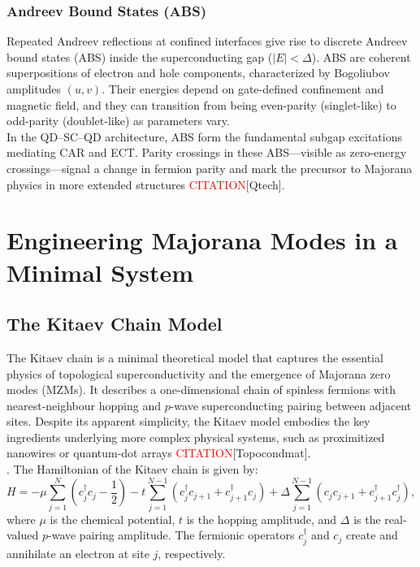 \documentclass[11pt, letterpaper, titlepage]{article}
\begin{document}
\subsubsection{Andreev Bound States (ABS)}
Repeated Andreev reflections at confined interfaces give rise to discrete Andreev bound states (ABS) inside the superconducting gap ($|E|<\Delta$). ABS are coherent superpositions of electron and hole components, characterized by Bogoliubov amplitudes $(u,v)$. Their energies depend on gate-defined confinement and magnetic field, and they can transition from being even-parity (singlet-like) to odd-parity (doublet-like) as parameters vary.\\
In the QD–SC–QD architecture, ABS form the fundamental subgap excitations mediating CAR and ECT. Parity crossings in these ABS—visible as zero-energy crossings—signal a change in fermion parity and mark the precursor to Majorana physics in more extended structures \textcolor{red}{CITATION}[Qtech].

\section{Engineering Majorana Modes in a Minimal System}
\subsection{The Kitaev Chain Model}

The Kitaev chain is a minimal theoretical model that captures the essential physics of topological superconductivity and the emergence of Majorana zero modes (MZMs). It describes a one-dimensional chain of spinless fermions with nearest-neighbour hopping and $p$-wave superconducting pairing between adjacent sites. Despite its apparent simplicity, the Kitaev model embodies the key ingredients underlying more complex physical systems, such as proximitized nanowires or quantum-dot arrays \textcolor{red}{CITATION}[Topocondmat].\\.
The Hamiltonian of the Kitaev chain is given by:
\begin{equation}
H = -\mu \sum_{j=1}^{N} \left(c_j^\dagger c_j - \frac{1}{2}\right)
- t \sum_{j=1}^{N-1} \left(c_j^\dagger c_{j+1} + c_{j+1}^\dagger c_j\right)
+ \Delta \sum_{j=1}^{N-1} \left(c_j c_{j+1} + c_{j+1}^\dagger c_j^\dagger\right),
\label{eq:kitaev_ham}
\end{equation}
where $\mu$ is the chemical potential, $t$ is the hopping amplitude, and $\Delta$ is the real-valued $p$-wave pairing amplitude. The fermionic operators $c_j^\dagger$ and $c_j$ create and annihilate an electron at site $j$, respectively.
\end{document}
